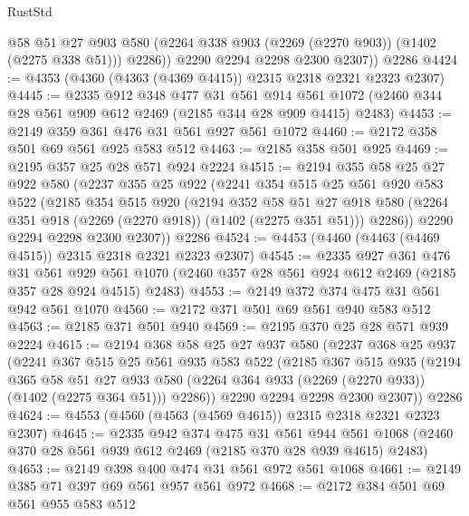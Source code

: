\begin{lexlean}{RustStd}
\begin{coremodule}
            @58
            @51
            @27
            @903
            @580
            (@2264 @338 @903 (@2269 (@2270 @903)) (@1402 (@2275 @338 @51)))
            @2286))
        @2290
        @2294
        @2298
        @2300
        @2307))
    @2286
@4424 := @4353 (@4360 (@4363 (@4369 @4415)) @2315 @2318 @2321 @2323 @2307)
@4445 := @2335
    @912
    @348
    @477
    @31
    @561
    @914
    @561
    @1072
    (@2460 @344 @28 @561 @909 @612 @2469 (@2185 @344 @28 @909 @4415) @2483)
@4453 := @2149 @359 @361 @476 @31 @561 @927 @561 @1072
@4460 := @2172 @358 @501 @69 @561 @925 @583 @512
@4463 := @2185 @358 @501 @925
@4469 := @2195 @357 @25 @28 @571 @924 @2224
@4515 := @2194
    @355
    @58
    @25
    @27
    @922
    @580
    (@2237
      @355
      @25
      @922
      (@2241
        @354
        @515
        @25
        @561
        @920
        @583
        @522
        (@2185
          @354
          @515
          @920
          (@2194
            @352
            @58
            @51
            @27
            @918
            @580
            (@2264 @351 @918 (@2269 (@2270 @918)) (@1402 (@2275 @351 @51)))
            @2286))
        @2290
        @2294
        @2298
        @2300
        @2307))
    @2286
@4524 := @4453 (@4460 (@4463 (@4469 @4515)) @2315 @2318 @2321 @2323 @2307)
@4545 := @2335
    @927
    @361
    @476
    @31
    @561
    @929
    @561
    @1070
    (@2460 @357 @28 @561 @924 @612 @2469 (@2185 @357 @28 @924 @4515) @2483)
@4553 := @2149 @372 @374 @475 @31 @561 @942 @561 @1070
@4560 := @2172 @371 @501 @69 @561 @940 @583 @512
@4563 := @2185 @371 @501 @940
@4569 := @2195 @370 @25 @28 @571 @939 @2224
@4615 := @2194
    @368
    @58
    @25
    @27
    @937
    @580
    (@2237
      @368
      @25
      @937
      (@2241
        @367
        @515
        @25
        @561
        @935
        @583
        @522
        (@2185
          @367
          @515
          @935
          (@2194
            @365
            @58
            @51
            @27
            @933
            @580
            (@2264 @364 @933 (@2269 (@2270 @933)) (@1402 (@2275 @364 @51)))
            @2286))
        @2290
        @2294
        @2298
        @2300
        @2307))
    @2286
@4624 := @4553 (@4560 (@4563 (@4569 @4615)) @2315 @2318 @2321 @2323 @2307)
@4645 := @2335
    @942
    @374
    @475
    @31
    @561
    @944
    @561
    @1068
    (@2460 @370 @28 @561 @939 @612 @2469 (@2185 @370 @28 @939 @4615) @2483)
@4653 := @2149 @398 @400 @474 @31 @561 @972 @561 @1068
@4661 := @2149 @385 @71 @397 @69 @561 @957 @561 @972
@4668 := @2172 @384 @501 @69 @561 @955 @583 @512

\end{coremodule}
\end{lexlean}
